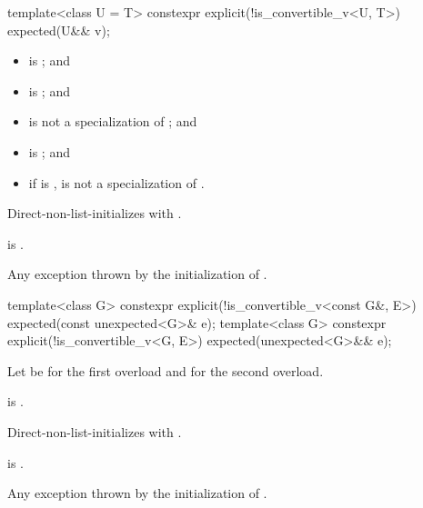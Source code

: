 %
\begin{itemdecl}
template<class U = T>
  constexpr explicit(!is_convertible_v<U, T>) expected(U&& v);
\end{itemdecl}

\begin{itemdescr}
\pnum
\constraints
\begin{itemize}
\item
{} is ; and
\item
{} is ; and
\item
{} is not a specialization of ; and
\item
{} is ; and
\item
if  is \cv{} ,
 is not a specialization of .
\end{itemize}

\pnum
\effects
Direct-non-list-initializes  with .

\pnum
\ensures
{} is .

\pnum
\throws
Any exception thrown by the initialization of .
\end{itemdescr}

%
\begin{itemdecl}
template<class G>
  constexpr explicit(!is_convertible_v<const G&, E>) expected(const unexpected<G>& e);
template<class G>
  constexpr explicit(!is_convertible_v<G, E>) expected(unexpected<G>&& e);
\end{itemdecl}

\begin{itemdescr}
\pnum
Let  be  for the first overload and
 for the second overload.

\pnum
\constraints
{} is .

\pnum
\effects
Direct-non-list-initializes  with .

\pnum
\ensures
{} is .

\pnum
\throws
Any exception thrown by the initialization of .
\end{itemdescr}


